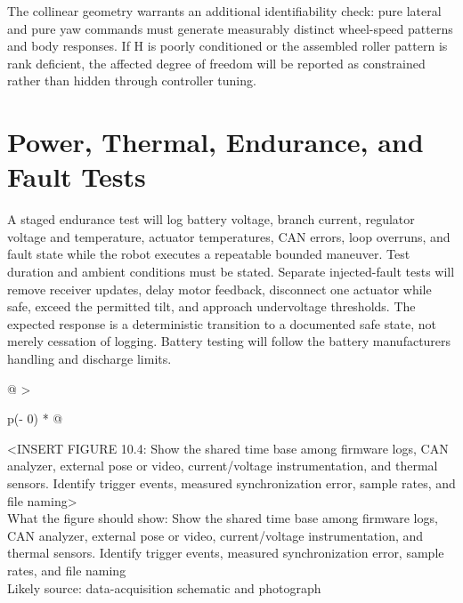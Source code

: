 The collinear geometry warrants an additional identifiability check:
pure lateral and pure yaw commands must generate measurably distinct
wheel-speed patterns and body responses. If H is poorly conditioned or
the assembled roller pattern is rank deficient, the affected degree of
freedom will be reported as constrained rather than hidden through
controller tuning.

\section{Power, Thermal, Endurance, and Fault Tests}\label{power-thermal-endurance-and-fault-tests}

A staged endurance test will log battery voltage, branch current,
regulator voltage and temperature, actuator temperatures, CAN errors,
loop overruns, and fault state while the robot executes a repeatable
bounded maneuver. Test duration and ambient conditions must be stated.
Separate injected-fault tests will remove receiver updates, delay motor
feedback, disconnect one actuator while safe, exceed the permitted tilt,
and approach undervoltage thresholds. The expected response is a
deterministic transition to a documented safe state, not merely
cessation of logging. Battery testing will follow the battery
manufacturer\textquotesingle s handling and discharge limits.

\begin{longtable}[]{@{}
  >{\raggedright\arraybackslash}p{(\columnwidth - 0\tabcolsep) * }@{}}
\toprule\noalign{}
\begin{minipage}[b]{\linewidth}\raggedright
\textless INSERT FIGURE 10.4: Show the shared time base among firmware
logs, CAN analyzer, external pose or video, current\slash{}voltage
instrumentation, and thermal sensors. Identify trigger events, measured
synchronization error, sample rates, and file naming\textgreater{}\\
What the figure should show: Show the shared time base among firmware
logs, CAN analyzer, external pose or video, current\slash{}voltage
instrumentation, and thermal sensors. Identify trigger events, measured
synchronization error, sample rates, and file naming\\
Likely source: data-acquisition schematic and photograph\strut
\end{minipage} \\
\midrule\noalign{}
\endhead
\bottomrule\noalign{}
\endlastfoot
\end{longtable}

